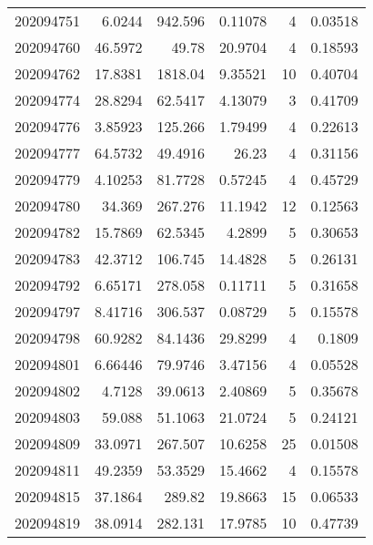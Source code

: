 \begin{tabular}{rrrrrr}
 202094751 &          6.0244  &      942.596  &            0.11078 &           4 & 0.03518 \\
 202094760 &         46.5972  &       49.78   &           20.9704  &           4 & 0.18593 \\
 202094762 &         17.8381  &     1818.04   &            9.35521 &          10 & 0.40704 \\
 202094774 &         28.8294  &       62.5417 &            4.13079 &           3 & 0.41709 \\
 202094776 &          3.85923 &      125.266  &            1.79499 &           4 & 0.22613 \\
 202094777 &         64.5732  &       49.4916 &           26.23    &           4 & 0.31156 \\
 202094779 &          4.10253 &       81.7728 &            0.57245 &           4 & 0.45729 \\
 202094780 &         34.369   &      267.276  &           11.1942  &          12 & 0.12563 \\
 202094782 &         15.7869  &       62.5345 &            4.2899  &           5 & 0.30653 \\
 202094783 &         42.3712  &      106.745  &           14.4828  &           5 & 0.26131 \\
 202094792 &          6.65171 &      278.058  &            0.11711 &           5 & 0.31658 \\
 202094797 &          8.41716 &      306.537  &            0.08729 &           5 & 0.15578 \\
 202094798 &         60.9282  &       84.1436 &           29.8299  &           4 & 0.1809  \\
 202094801 &          6.66446 &       79.9746 &            3.47156 &           4 & 0.05528 \\
 202094802 &          4.7128  &       39.0613 &            2.40869 &           5 & 0.35678 \\
 202094803 &         59.088   &       51.1063 &           21.0724  &           5 & 0.24121 \\
 202094809 &         33.0971  &      267.507  &           10.6258  &          25 & 0.01508 \\
 202094811 &         49.2359  &       53.3529 &           15.4662  &           4 & 0.15578 \\
 202094815 &         37.1864  &      289.82   &           19.8663  &          15 & 0.06533 \\
 202094819 &         38.0914  &      282.131  &           17.9785  &          10 & 0.47739 \\

\end{tabular}
